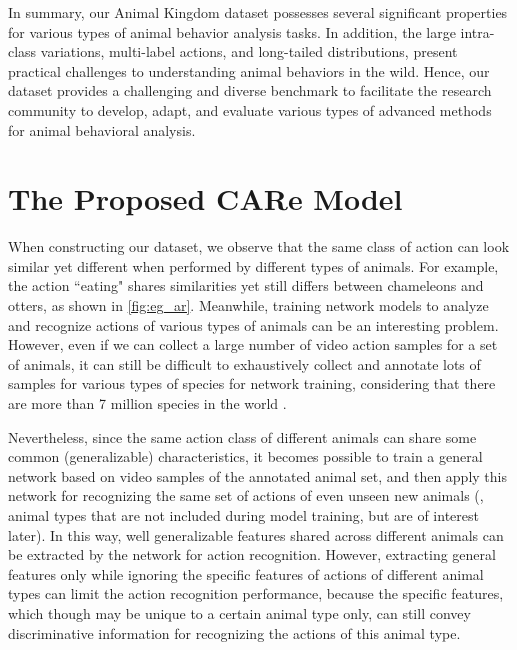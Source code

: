 \documentclass[10pt,twocolumn,letterpaper]{article}
\begin{document}
    
    
    In summary, our Animal Kingdom dataset possesses several significant properties for various types of animal behavior analysis tasks. In addition, the large intra-class variations, multi-label actions, and long-tailed distributions, present practical challenges to understanding animal behaviors in the wild. Hence, our dataset provides a challenging and diverse benchmark to facilitate the research community to develop, adapt, and evaluate various types of advanced methods for animal behavioral analysis.
    
    
    \section{\textbf{The Proposed CARe Model}}
    
    
    When constructing our dataset, we observe that the same class of action can look similar yet different when performed by different types of animals. For example, the action ``eating" shares similarities yet still differs between chameleons and otters, as shown in \cref{fig:eg_ar}. Meanwhile, training network models to analyze and recognize actions of various types of animals can be an interesting problem. However, even if we can collect a large number of video action samples for a set of animals, it can still be difficult to exhaustively 
    collect and annotate lots of samples for various types of species for network training, considering that there are more than 7 million species in the world \cite{mora2011many}. 
    
    Nevertheless, since the same action class of different animals can share some common (generalizable) characteristics, it becomes possible to train a general network based on video samples of the annotated animal set, and then apply this network for recognizing the same set of actions of even unseen new animals (\ie, animal types that are not included during model training, but are of interest later).
    In this way, well generalizable features shared across different animals can be extracted by the network for action recognition. 
    However, extracting general features only while ignoring the specific features of actions of different animal types can limit the action recognition performance, because the specific features, which though may be unique to a certain animal type only, can still convey discriminative information for recognizing the actions of this animal type. 
    
\end{document}
